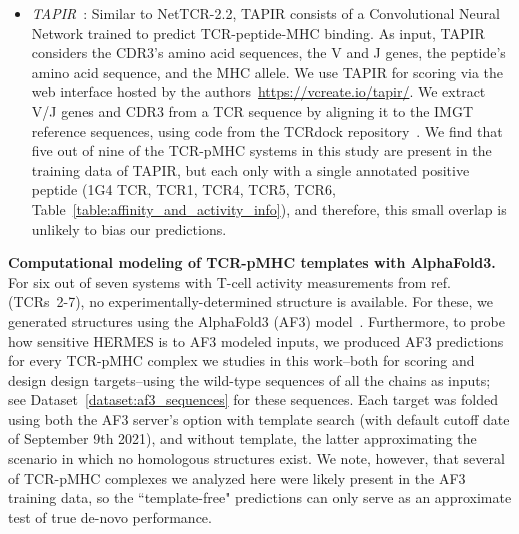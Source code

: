 \begin{itemize}
We query NetTCR2.2 through the authors' web server
(\url{https://services.healthtech.dtu.dk/services/NetTCR-2.2/}). CDR boundaries are assigned by
aligning each TCR sequence to the IMGT reference sequences, using code from the TCRdock
repository~\cite{Bradley2023-rl}. Of the TCR-pMHC pairs examined in this work, only one system
(TCR1, Table~\ref{table:affinity_and_activity_info}) appears in the NetTCR2.2 training set, and even
then with just a single annotated positive peptide. Therefore, this small overlap is unlikely to
bias our predictions.\\

\item {\em TAPIR}~\cite{Fast2023-tk}: Similar to NetTCR-2.2, TAPIR consists of a Convolutional
Neural Network trained to predict TCR-peptide-MHC binding. As input, TAPIR considers the CDR3's
amino acid sequences, the V and J genes, the peptide's amino acid sequence, and the MHC allele. We
use TAPIR for scoring via the web interface hosted by the authors~\url{https://vcreate.io/tapir/}.
We extract V/J genes and CDR3 from a TCR sequence by aligning it to the IMGT reference sequences,
using code from the TCRdock repository~\cite{Bradley2023-rl}. We find that five out of nine of the
TCR-pMHC systems in this study are present in the training data of TAPIR, but each only with a
single annotated positive peptide (1G4 TCR, TCR1, TCR4, TCR5, TCR6,
Table~\ref{table:affinity_and_activity_info}), and therefore, this small overlap is unlikely to bias
our predictions.

\end{itemize}


\noindent \textbf{Computational modeling of TCR-pMHC templates with AlphaFold3.} For six out of
seven systems with T-cell activity measurements from ref.~\cite{Luksza2022-gx} (TCRs~2-7), no
experimentally-determined structure is available. For these, we generated structures using the
AlphaFold3 (AF3) model~\cite{Abramson2024-jp}. Furthermore, to probe how sensitive HERMES is to AF3
modeled inputs, we produced AF3 predictions for every TCR-pMHC complex we studies in this work--both
for scoring and design design targets--using the wild-type sequences of all the chains as inputs;
see Dataset~\ref{dataset:af3_sequences} for these sequences. Each target was folded using both the
AF3 server's option with template search (with default cutoff date of September 9th 2021), and
without template, the latter approximating the scenario in which no homologous structures exist. We
note, however, that several of TCR-pMHC complexes we analyzed here were likely present in the AF3
training data, so the ``template-free" predictions can only serve as an approximate test of true
de-novo performance.

